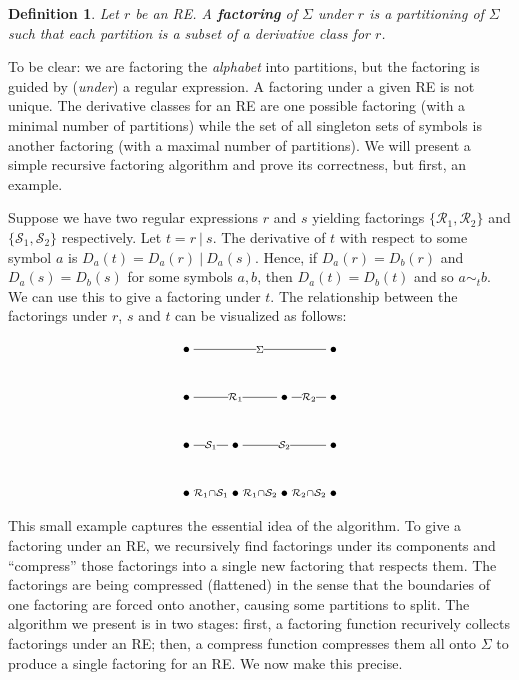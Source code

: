 \documentclass[11pt]{article}
\newcommand{\RE}{r}
\newcommand{\OR}{\ | \ }
\newcommand{\CS}{\mathcal{S}}
\newcommand{\CR}{\mathcal{R}}
\newcommand{\New}[1]{\emph{\textbf{#1}}}
\newtheorem*{definition}{Definition}
\begin{document}
\begin{definition}
Let $r$ be an RE.  A \New{factoring} of $\Sigma$ under $r$ is a partitioning of $\Sigma$ such that each partition is a subset of a derivative class for $\RE$.
\end{definition}

To be clear: we are factoring the \emph{alphabet} into partitions, but the factoring is guided by (\emph{under}) a regular expression.  A factoring under a given RE is not unique.  The derivative classes for an RE are one possible factoring (with a minimal number of partitions) while the set of all singleton sets of symbols is another factoring (with a maximal number of partitions).  We will present a simple recursive factoring algorithm and prove its correctness, but first, an example.

Suppose we have two regular expressions $r$ and $s$ yielding factorings $\{ \CR_1, \CR_2 \}$ and $\{ \CS_1, \CS_2 \}$ respectively.  Let $t = r \OR s$.  The derivative of $t$ with respect to some symbol $a$ is $D_a(t) = D_a(r) \OR D_a(s)$.  Hence, if $D_a(r) = D_b(r)$ and $D_a(s) = D_b(s)$ for some symbols $a, b$, then $D_a(t) = D_b(t)$ and so $a \sim_t b$.  We can use this to give a factoring under $t$.  The relationship between the factorings under $r$, $s$ and $t$ can be visualized as follows:

\[
  \xymatrix{
    \bullet \ar@{-}[rrr]|{\Sigma} &&& \bullet \\
    \bullet \ar@{-}[rr]|{\CR_1} && \bullet \ar@{-}[r]|{\CR_2} & \bullet \\
    \bullet \ar@{-}[r]|{\CS_1} & \bullet \ar@{-}[rr]|{\CS_2} &&  \bullet \\
    \bullet \ar@{-}[r]|{\CR_1 \cap \CS_1} & 
    \bullet \ar@{-}[r]|{\CR_1 \cap \CS_2} & 
    \bullet \ar@{-}[r]|{\CR_2 \cap \CS_2} &
    \bullet
  }
\]

This small example captures the essential idea of the algorithm.  To give a factoring under an RE, we recursively find factorings under its components and ``compress'' those factorings into a single new factoring that respects them.  The factorings are being compressed (flattened) in the sense that the boundaries of one factoring are forced onto another, causing some partitions to split.  The algorithm we present is in two stages: first, a factoring function recurively collects factorings under an RE; then, a compress function compresses them all onto $\Sigma$ to produce a single factoring for an RE.  We now make this precise.
\end{document}
